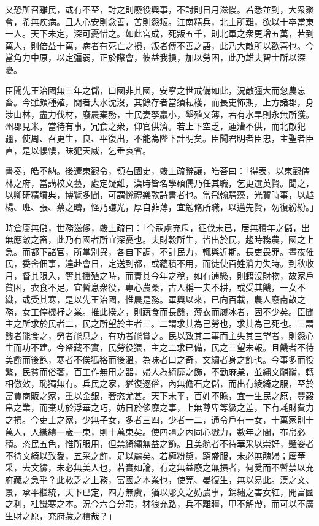 \begin{pinyinscope}
又恐所召離民，或有不至，討之則廢役興事，不討則日月滋慢。若悉並到，大衆聚會，希無疾病。且人心安則念善，苦則怨叛。江南精兵，北土所難，欲以十卒當東一人。天下未定，深可憂惜之。如此宮成，死叛五千，則北軍之衆更增五萬，若到萬人，則倍益十萬，病者有死亡之損，叛者傳不善之語，此乃大敵所以歡喜也。今當角力中原，以定彊弱，正於際會，彼益我損，加以勞困，此乃雄夫智士所以深憂。

臣聞先王治國無三年之儲，曰國非其國，安寧之世戒備如此，況敵彊大而忽農忘畜。今雖頗種殖，閒者大水沈沒，其餘存者當須耘穫，而長吏怖期，上方諸郡，身涉山林，盡力伐材，廢農棄務，士民妻孥羸小，墾殖又薄，若有水旱則永無所獲。州郡見米，當待有事，冗食之衆，仰官供濟。若上下空乏，運漕不供，而北敵犯疆，使周、召更生，良、平復出，不能為陛下計明矣。臣聞君明者臣忠，主聖者臣直，是以慺慺，昧犯天威，乞垂哀省。

書奏，皓不納。後遷東觀令，領右國史，覈上疏辭讓，皓荅曰：「得表，以東觀儒林之府，當講校文藝，處定疑難，漢時皆名學碩儒乃任其職，乞更選英賢。聞之，以卿研精墳典，博覽多聞，可謂恱禮樂敦詩書者也。當飛翰騁藻，光贊時事，以越楊、班、張、蔡之疇，怪乃謙光，厚自菲薄，宜勉脩所職，以邁先賢，勿復紛紛。」

時倉廩無儲，世務滋侈，覈上疏曰：「今寇虜充斥，征伐未已，居無積年之儲，出無應敵之畜，此乃有國者所宜深憂也。夫財穀所生，皆出於民，趨時務農，國之上急。而都下諸官，所掌別異，各自下調，不計民力，輒與近期。長吏畏罪。晝夜催民，委舍佃事，遑赴會日，定送到都，或蘊積不用，而徒使百姓消力失時。到秋收月，督其限入，奪其播殖之時，而責其今年之稅，如有逋懸，則籍沒財物，故家戶貧困，衣食不足。宜暫息衆役，專心農桑，古人稱一夫不耕，或受其饑，一女不織，或受其寒，是以先王治國，惟農是務。軍興以來，已向百載，農人廢南畝之務，女工停機杼之業。推此揆之，則蔬食而長饑，薄衣而履冰者，固不少矣。臣聞主之所求於民者二，民之所望於主者三。二謂求其為己勞也，求其為己死也。三謂饑者能食之，勞者能息之，有功者能賞之。民以致其二事而主失其三望者，則怨心生而功不建。今帑藏不實，民勞役猥，主之二求已備，民之三望未報。且饑者不待美饌而後飽，寒者不俟狐狢而後溫，為味者口之奇，文繡者身之飾也。今事多而役繁，民貧而俗奢，百工作無用之器，婦人為綺靡之飾，不勤麻枲，並繡文黼黻，轉相倣效，恥獨無有。兵民之家，猶復逐俗，內無儋石之儲，而出有綾綺之服，至於富賈商販之家，重以金銀，奢恣尤甚。天下未平，百姓不贍，宜一生民之原，豐穀帛之業，而棄功於浮華之巧，妨日於侈靡之事，上無尊卑等級之差，下有耗財費力之損。今吏士之家，少無子女，多者三四，少者一二，通令戶有一女，十萬家則十萬人，人織績一歲一束，則十萬束矣。使四疆之內同心戮力，數年之間，布帛必積。恣民五色，惟所服用，但禁綺繡無益之飾。且美貌者不待華采以崇好，豔姿者不待文綺以致愛，五采之飾，足以麗矣。若極粉黛，窮盛服，未必無醜婦；廢華采，去文繡，未必無美人也，若實如論，有之無益廢之無損者，何愛而不暫禁以充府藏之急乎？此救乏之上務，富國之本業也，使筦、晏復生，無以易此。漢之文、景，承平繼統，天下已定，四方無虞，猶以彫文之妨農事，錦繡之害女紅，開富國之利，杜饑寒之本。況今六合分乖，犲狼充路，兵不離疆，甲不解帶，而可以不廣生財之原，充府藏之積哉？」


\end{pinyinscope}
